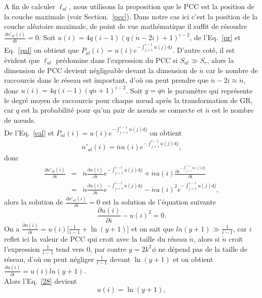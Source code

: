 A fin de calculer $\ell_{al}$, nous utilisons la proposition que le PCC est la position de la couche maximale (voir Section.~\ref{pcc}). Dans notre cas ici c'est la position de la couche aléatoire maximale, de point de vue mathématique il suffit de résoudre $\frac{\partial n'_{al}(i)}{di}=0$. Soit $u(i)=4q(i-1)(q(\acute{n}-2i)+1)^{i-2}$, de l'Eq.~\eqref{pr} et Eq.~\eqref{pal} on obtient que $P_{al}(i)=u(i)e^{-\int_{j=1}^{i-1}u(j)dj}$. D'autre coté, il est évident que $\ell_{al}$ prédomine dans l'expression du PCC si $S_{al}\gg S_r$, alors la dimension de PCC devient négligeable devant la dimension de $\acute{n}$ car le nombre de raccourcis dans le réseau est important, d'où on peut prendre que $\acute{n}-2i\approx \acute{n}$, donc
$u(i)=4q(i-1)(q\acute{n}+1)^{i-2}$. Soit  $y=q\acute{n}$ le paramètre qui représente le degré moyen de raccourcis pour chaque nœud après la transformation de GR, car $q$ est la probabilité pour qu'un pair de nœuds se connecte et $\acute{n}$ est le nombre de nœuds.\\
 De l'Eq.~\eqref{cal} et $P_{al}(i)=u(i)e^{-\int_{j=1}^{i-1}u(j)dj}$  on obtient
\begin{eqnarray}
n'_{al}(i)=\acute{n}u(i)e^{-\int_{j=1}^{i-1}u(j)dj},
\end{eqnarray}
donc 
\begin{eqnarray}
\frac{\partial n'_{al}(i)}{\partial i}&=&\acute{n}\frac{\partial u(i)}{\partial i}e^{-\int_{j=1}^{i-1}u(j)dj}+\acute{n}u(i)\frac{\partial e^{-\int_{j=1}^{i-1}u(j)dj}}{\partial i}\\\nonumber
&=&\acute{n}\frac{\partial u(i)}{\partial i}e^{-\int_{j=1}^{i-1}u(j)dj}-\acute{n}u(i)^2e^{-\int_{j=1}^{i-1}u(j)dj},\nonumber
\end{eqnarray}
alors la solution de $\frac{\partial n'_{al}(i)}{\partial i}=0$ est la solution de l'équation suivante
\begin{equation}
\frac{\partial u(i)}{\partial i}-u(i)^2=0.
\label{28}
\end{equation}
On a $\frac{\partial u(i)}{\partial i}=u(i)\big[\frac{1}{i-1}+\ln(y+1)\big]$ et on sait que $ln(y+1)\gg\frac{1}{i-1}$, car $i$ reflet ici la valeur de PCC qui croit avec la taille 
du réseau $\acute{n}$, alors si $\acute{n}$ croit l'expression $\frac{1}{i-1}$ tend vers $0$, par contre $y=2k^2\phi$ ne dépend pas de la taille de réseau, d'où on peut négliger $\frac{1}{i-1}$ devant
$\ln(y+1)$ et  on obtient $\frac{\partial u(i)}{\partial i}=u(i)ln(y+1)$.\\
Alors l'Eq.~\eqref{28} devient
\begin{equation}
u(i)=\ln(y+1),
\label{29}
\end{equation}

